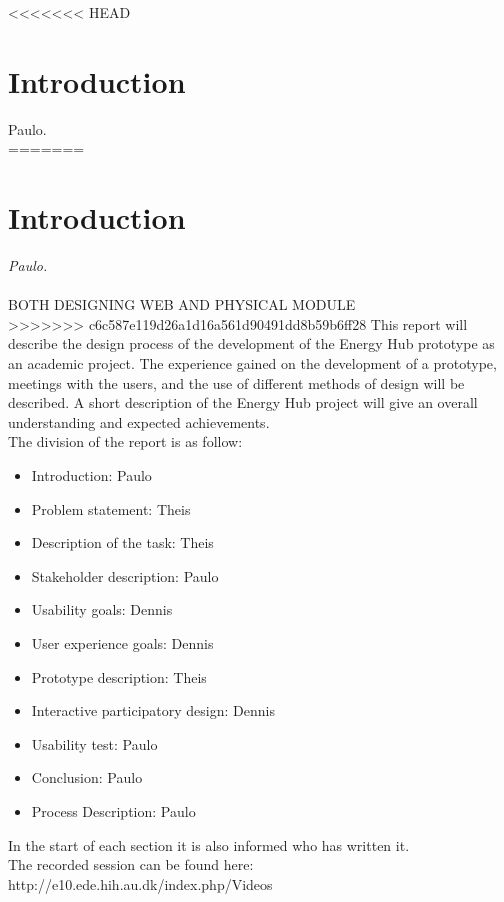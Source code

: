 <<<<<<< HEAD
\section{Introduction}Paulo.\\
=======

\section{Introduction}\textit{Paulo.}\\
\\ BOTH DESIGNING WEB AND PHYSICAL MODULE
\\
>>>>>>> c6c587e119d26a1d16a561d90491dd8b59b6ff28
This report will describe the design process of the development of the Energy Hub prototype as an academic project. The experience gained on the development of a prototype, meetings with the users, and the use of different methods of design will be described. A short description of the Energy Hub project will give an overall understanding and expected achievements.
\\ The division of the report is as follow: 
\begin{itemize}
	\item Introduction: Paulo
	\item Problem statement: Theis
	\item Description of the task: Theis
	\item Stakeholder description: Paulo
	\item Usability goals: Dennis
	\item User experience goals: Dennis
	\item Prototype description: Theis
	\item Interactive participatory design: Dennis
	\item Usability test: Paulo
	\item Conclusion: Paulo
	\item Process Description: Paulo
\end{itemize}
In the start of each section it is also informed who has written it.
\\
The recorded session can be found here: http://e10.ede.hih.au.dk/index.php/Videos
